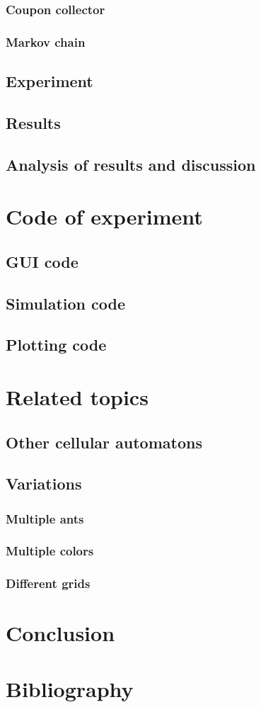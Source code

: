 \documentclass{article}
\begin{document}
\subsubsection{Coupon collector}
\subsubsection{Markov chain}
\subsection{Experiment}
\subsection{Results}
\subsection{Analysis of results and discussion}

\section{Code of experiment}
\subsection{GUI code}
\subsection{Simulation code}
\subsection{Plotting code}

\section{Related topics}
\subsection{Other cellular automatons}
\subsection{Variations}
\subsubsection{Multiple ants}
\subsubsection{Multiple colors}
\subsubsection{Different grids}


\section{Conclusion}


\section{Bibliography}
\end{document}
